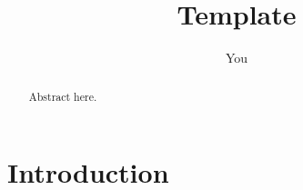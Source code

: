\documentclass{article}
\title{Template}
\author{You}
\begin{document}
\maketitle

\begin{abstract}
Abstract here.
\end{abstract}


\section{Introduction}
\cite{Felsenstein1981-zs}





\end{document}
